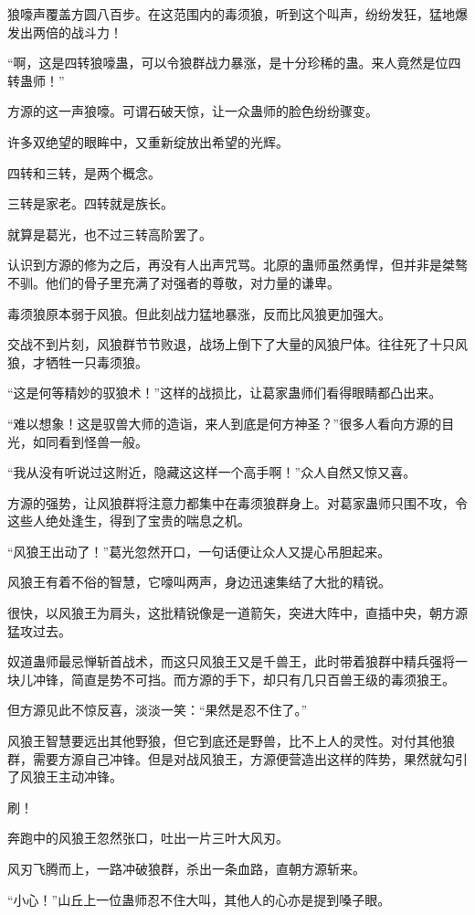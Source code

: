 \begin{this_body}
狼嚎声覆盖方圆八百步。在这范围内的毒须狼，听到这个叫声，纷纷发狂，猛地爆发出两倍的战斗力！

“啊，这是四转狼嚎蛊，可以令狼群战力暴涨，是十分珍稀的蛊。来人竟然是位四转蛊师！”

方源的这一声狼嚎。可谓石破天惊，让一众蛊师的脸色纷纷骤变。

许多双绝望的眼眸中，又重新绽放出希望的光辉。

四转和三转，是两个概念。

三转是家老。四转就是族长。

就算是葛光，也不过三转高阶罢了。

认识到方源的修为之后，再没有人出声咒骂。北原的蛊师虽然勇悍，但并非是桀骜不驯。他们的骨子里充满了对强者的尊敬，对力量的谦卑。

毒须狼原本弱于风狼。但此刻战力猛地暴涨，反而比风狼更加强大。

交战不到片刻，风狼群节节败退，战场上倒下了大量的风狼尸体。往往死了十只风狼，才牺牲一只毒须狼。

“这是何等精妙的驭狼术！”这样的战损比，让葛家蛊师们看得眼睛都凸出来。

“难以想象！这是驭兽大师的造诣，来人到底是何方神圣？”很多人看向方源的目光，如同看到怪兽一般。

“我从没有听说过这附近，隐藏这这样一个高手啊！”众人自然又惊又喜。

方源的强势，让风狼群将注意力都集中在毒须狼群身上。对葛家蛊师只围不攻，令这些人绝处逢生，得到了宝贵的喘息之机。

“风狼王出动了！”葛光忽然开口，一句话便让众人又提心吊胆起来。

风狼王有着不俗的智慧，它嚎叫两声，身边迅速集结了大批的精锐。

很快，以风狼王为肩头，这批精锐像是一道箭矢，突进大阵中，直插中央，朝方源猛攻过去。

奴道蛊师最忌惮斩首战术，而这只风狼王又是千兽王，此时带着狼群中精兵强将一块儿冲锋，简直是势不可挡。而方源的手下，却只有几只百兽王级的毒须狼王。

但方源见此不惊反喜，淡淡一笑：“果然是忍不住了。”

风狼王智慧要远出其他野狼，但它到底还是野兽，比不上人的灵性。对付其他狼群，需要方源自己冲锋。但是对战风狼王，方源便营造出这样的阵势，果然就勾引了风狼王主动冲锋。

刷！

奔跑中的风狼王忽然张口，吐出一片三叶大风刃。

风刃飞腾而上，一路冲破狼群，杀出一条血路，直朝方源斩来。

“小心！”山丘上一位蛊师忍不住大叫，其他人的心亦是提到嗓子眼。


\end{this_body}
